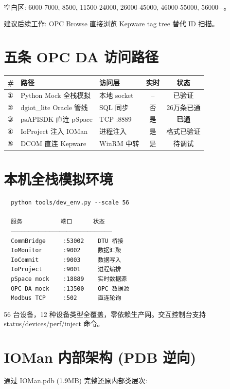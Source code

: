 \documentclass[12pt,a4paper]{ctexart}
\begin{document}
空白区: 6000-7000, 8500, 11500-24000, 26000-45000, 46000-55000, 56000+。

建议后续工作: OPC Browse 直接浏览 Kepware tag tree 替代 ID 扫描。

\section{五条 OPC DA 访问路径}

\begin{table}[H]\centering
\begin{tabular}{lllcc}
\toprule
\textbf{\#} & \textbf{路径} & \textbf{访问层} & \textbf{实时} & \textbf{状态} \\
\midrule
① & Python Mock 全栈模拟 & 本地 socket & -- & 已验证 \\
② & dgiot\_lite Oracle 管线 & SQL 同步 & 否 & 26万条已通 \\
③ & psAPISDK 直连 pSpace & TCP :8889 & 是 & \textbf{已通} \\
④ & IoProject 注入 IOMan & 进程注入 & 是 & 格式已验证 \\
⑤ & DCOM 直连 Kepware & WinRM 中转 & 是 & 待调试 \\
\bottomrule
\end{tabular}
\end{table}

\section{本机全栈模拟环境}

\begin{verbatim}
  python tools/dev_env.py --scale 56

  服务           端口      状态
  ─────────────────────────────
  CommBridge     :53002    DTU 桥接
  IoMonitor      :9002     数据汇聚
  IoCommit       :9003     数据写入
  IoProject      :9001     进程编排
  pSpace mock    :18889    实时数据源
  OPC DA mock    :13500    OPC 数据源
  Modbus TCP     :502      直连轮询
\end{verbatim}

56 台设备，12 种设备类型全覆盖，零依赖生产网。交互控制台支持 status/devices/perf/inject 命令。

\section{IOMan 内部架构 (PDB 逆向)}

通过 IOMan.pdb (1.9MB) 完整还原内部类层次:
\end{document}
